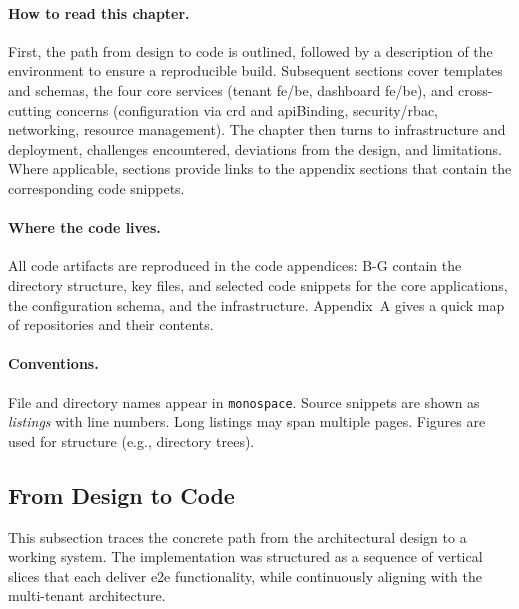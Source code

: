 \documentclass[11pt, a4paper, oneside, listof=totoc]{scrartcl}
\begin{document}
            \paragraph{How to read this chapter.}\label{par:howToReadThisChapter}
                First, the path from design to code is outlined, followed by a description of the
                environment to ensure a reproducible build.
                Subsequent sections cover templates and schemas, the four core services
                (tenant \gls{fe}/\gls{be}, dashboard \gls{fe}/\gls{be}), and cross-cutting concerns
                (configuration via \gls{crd} and \gls{api}Binding, security/\gls{rbac}, networking, 
                resource management).
                The chapter then turns to infrastructure and deployment, challenges encountered,
                deviations from the design, and limitations.
                Where applicable, sections provide links to the appendix sections that contain the
                corresponding code snippets.

            \paragraph{Where the code lives.}\label{par:whereTheCodeLives}
                All code artifacts are reproduced in the code appendices: B-G contain the directory
                structure, key files, and selected code snippets for the core applications, the
                configuration schema, and the infrastructure.
                Appendix~A gives a quick map of repositories and their contents.

            \paragraph{Conventions.}\label{par:conventions}
                File and directory names appear in \texttt{monospace}.
                Source snippets are shown as \emph{listings} with line numbers.
                Long listings may span multiple pages.
                Figures are used for structure (e.g., directory trees).

    \clearpage

        \subsection{From Design to Code}\label{subsec:fromDesignToCode}
            This subsection traces the concrete path from the architectural design to a working
            system.
            The implementation was structured as a sequence of vertical slices that each deliver
            \gls{e2e} functionality, while continuously aligning with the multi-tenant architecture.
\end{document}
